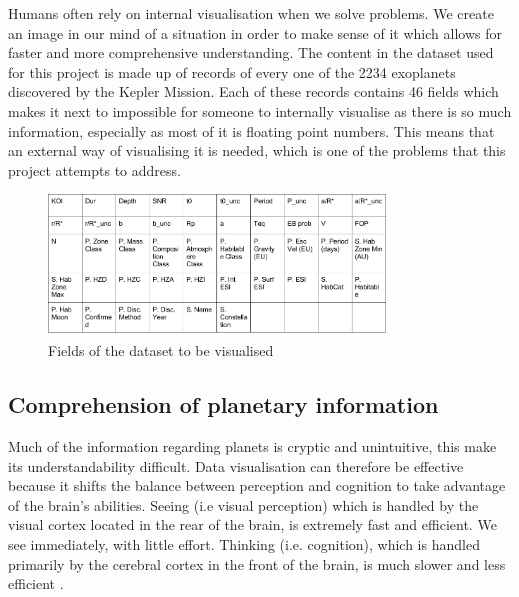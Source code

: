 Humans often rely on internal visualisation when we solve problems. We create an
image in our mind of a situation in order to make sense of it
\cite{visualisingpiggott} which allows for faster and more comprehensive
understanding. The content in the dataset used
for this project is made up of records of every one of the 2234 exoplanets
discovered by the Kepler Mission. Each of these records contains 46 fields which
makes it next to impossible for someone to internally visualise as there is so
much information,
especially as most of it is floating point numbers. This means that an external
way of visualising it is needed, which is one of the problems that this project
attempts to address. 
\begin{figure}[H]
  \centering
      \includegraphics[width=0.8\textwidth]{images/data.png}
  \caption{Fields of the dataset to be visualised}
\end{figure}

\subsection{Comprehension of planetary information}
Much of the information regarding planets is cryptic and unintuitive, this make
its understandability difficult. Data visualisation can therefore be effective
because it
shifts the balance between perception and cognition to take advantage of
the brain's abilities. Seeing (i.e visual perception) which is handled by the
visual cortex located in the rear of the brain, is extremely fast and efficient.
We see immediately, with little effort. Thinking (i.e. cognition), which is
handled primarily by the cerebral cortex in the front of the brain, is much
slower and less efficient \cite{few}.

